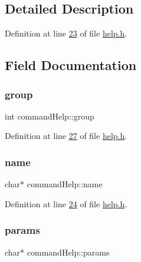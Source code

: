 \subsection{Detailed Description}


Definition at line \hyperlink{help_8h_source_l00023}{23} of file \hyperlink{help_8h_source}{help.\+h}.



\subsection{Field Documentation}
\mbox{\label{structcommandHelp_aa62d526b0ceb5e0840f1ebc710e2e31d}} 
\subsubsection{\texorpdfstring{group}{group}}
{\footnotesize\ttfamily int command\+Help\+::group}



Definition at line \hyperlink{help_8h_source_l00027}{27} of file \hyperlink{help_8h_source}{help.\+h}.

\mbox{\label{structcommandHelp_af9eb2e7147a85ca61399a9362d8f3bca}} 
\subsubsection{\texorpdfstring{name}{name}}
{\footnotesize\ttfamily char$\ast$ command\+Help\+::name}



Definition at line \hyperlink{help_8h_source_l00024}{24} of file \hyperlink{help_8h_source}{help.\+h}.

\mbox{\label{structcommandHelp_a2f79db81119f42010852d00341e3d23e}} 
\subsubsection{\texorpdfstring{params}{params}}
{\footnotesize\ttfamily char$\ast$ command\+Help\+::params}



